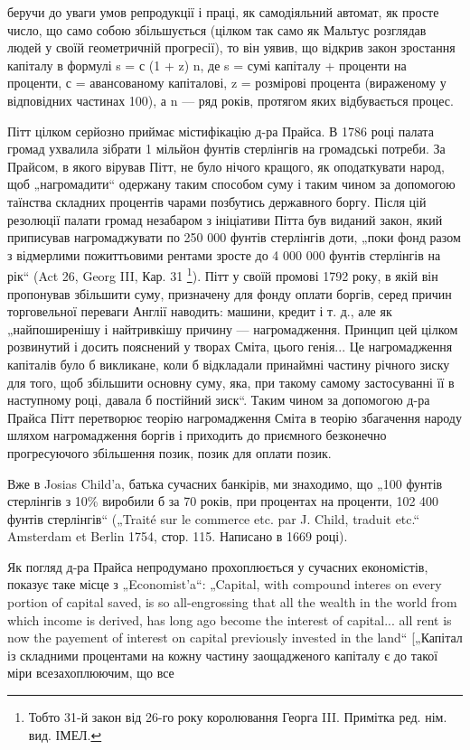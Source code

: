 беручи до уваги умов репродукції і праці, як самодіяльний
автомат, як просте число, що само собою збільшується (цілком
так само як Мальтус розглядав людей у своїй геометричній
прогресії), то він уявив, що відкрив закон зростання капіталу
в формулі s = с (1 + z) n, де s = сумі капіталу + проценти на
проценти, с = авансованому капіталові, z = розмірові процента
(вираженому у відповідних частинах 100), а n — ряд років, протягом
яких відбувається процес.

Пітт цілком серйозно приймає містифікацію д-ра Прайса.
В 1786 році палата громад ухвалила зібрати 1 мільйон фунтів стерлінгів
на громадські потреби. За Прайсом, в якого вірував Пітт,
не було нічого кращого, як оподаткувати народ, щоб „нагромадити“
одержану таким способом суму і таким чином за допомогою
таїнства складних процентів чарами позбутись державного
боргу. Після цій резолюції палати громад незабаром з ініціативи
Пітта був виданий закон, який приписував нагромаджувати по
250 000 фунтів стерлінгів доти, „поки фонд разом з відмерлими
пожиттьовими рентами зросте до 4 000 000 фунтів стерлінгів
на рік“ (Act 26, Georg III, Кар. 31 \footnote*{
Тобто 31-й закон від 26-го року королювання Георга III. Примітка ред.
нім. вид. ІМЕЛ.
}). Пітт у своїй промові 1792 року,
в якій він пропонував збільшити суму, призначену для фонду
оплати боргів, серед причин торговельної переваги Англії наводить:
машини, кредит і т. д., але як „найпоширенішу і найтривкішу
причину — нагромадження. Принцип цей цілком розвинутий
і досить пояснений у творах Сміта, цього генія... Це нагромадження
капіталів було б викликане, коли б відкладали принаймні
частину річного зиску для того, щоб збільшити основну
суму, яка, при такому самому застосуванні її в наступному році,
давала б постійний зиск“. Таким чином за допомогою д-ра Прайса
Пітт перетворює теорію нагромадження Сміта в теорію збагачення
народу шляхом нагромадження боргів і приходить до
приємного безконечно прогресуючого збільшення позик, позик
для оплати позик.

Вже в Josias Child’a, батька сучасних банкірів, ми знаходимо,
що „100 фунтів стерлінгів з 10\% виробили б за 70 років, при
процентах на проценти, 102 400 фунтів стерлінгів“ („Traité sur le
commerce etc. par J. Child, traduit etc.“ Amsterdam et Berlin
1754, стор. 115. Написано в 1669 році).

Як погляд д-ра Прайса непродумано прохоплюється у сучасних
економістів, показує таке місце з „Economist’a“: „Capital,
with compound interes on every portion of capital saved, is so
all-engrossing that all the wealth in the world from which income
is derived, has long ago become the interest of capital... all rent is
now the payement of interest on capital previously invested in the
land“ [„Капітал із складними процентами на кожну частину заощадженого
капіталу є до такої міри всезахоплюючим, що все